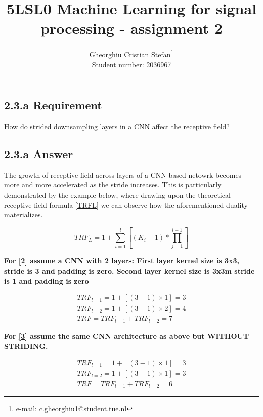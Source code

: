 \documentclass{vgtc}                          %
\title{5LSL0 Machine Learning for signal processing - assignment 2}
\author{Gheorghiu Cristian Stefan\thanks{e-mail: c.gheorghiu1@student.tue.nl}\\ %
        \scriptsize Student number: 2036967}
\begin{document}

\maketitle
\subsection{2.3.a Requirement}
How do strided downsampling layers in a CNN affect the receptive field?
\subsection{2.3.a Answer}
The growth of receptive field across layers of a CNN based netowrk becomes more and more accelerated as the stride increases. This is particularly demonstrated by the example below, where drawing upon the theoretical receptive field formula \ref{TRFL} we can observe how the aforementioned duality materializes. 

\begin{equation}
TRF_L = 1+\sum_{i=1}^l[(K_i - 1)*\prod_{j=1}^{l-1}]
\label{TRFL}
\end{equation}

   \textbf{For \ref{2} assume a CNN with 2 layers: First layer kernel size is 3x3, stride is 3 and padding is zero. Second layer kernel size is 3x3m stride is 1 and padding is zero}
   
\begin{equation}
\begin{gathered}
TRF_{l=1} = 1 + [(3 - 1) \times 1] = 3 \\
TRF_{l=2} = 1 + [(3 - 1) \times 2] = 4 \\
TRF = TRF_{l=1} + TRF_{l=2} = 7
\label{2}
\end{gathered}
\end{equation}

      \textbf{For \ref{3} assume the same CNN architecture as above but WITHOUT STRIDING.}
   
\begin{equation}
\begin{gathered}
TRF_{l=1} = 1 + [(3 - 1) \times 1] = 3 \\
TRF_{l=2} = 1 + [(3 - 1) \times 1] = 3 \\
TRF = TRF_{l=1} + TRF_{l=2} = 6
\label{3}
\end{gathered}
\end{equation}
\end{document}
